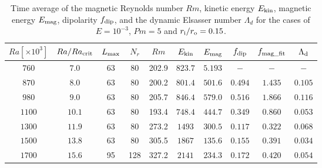 \begin{table}
\begin{center}
\caption{Time average of the magnetic Reynolds number $Rm$, kinetic energy $E_{\rm kin}$, magnetic energy $E_{\rm mag}$, dipolarity $f_{\rm dip}$, and the dynamic Elsasser number $\Lambda_{d}$ for the cases of $E = 10^{-3}$, $Pm = 5$ and $r_{\rm i}/r_{\rm o} = 0.15$.}
 \label{table:Summary_15}

  \begin{tabular}{cccccccccc}
      \hline
     $Ra[\times 10^3]$  &  $Ra/Ra_{\rm crit}$&
     {\color{black} $L_{\rm max}$} & {\color{black} $N_{r}$} & {\color{black} $Rm$} & $E_{\rm kin}$  &  $E_{\rm mag}$ & $f_{\rm dip}$ & $f_{\rm mag\_fit}$ & $\Lambda_{\rm d}$\\
    \hline
    $760$  & $7.0$ & 63 & 80 &  202.9 & $823.7$ & $5.193$ & $-$ & $-$ & $-$ \\
    $870$  & $8.0$ & 63 & 80 &  200.2 & $801.4$ & $501.6$ & $0.494$ & $1.435$ &  $0.105$\\
    $980$  & $9.0$ & 63 & 80 &  205.7 & $846.4$ & $579.0$ & $0.516$ & $1.866$ & $0.116$\\
    $1100$  & $10.1$ & 63 & 80 &  193.4 & $748.4$ & $444.7$ & $0.349$ & $0.860$ & $0.053$\\
    $1300$  & $11.9$ & 63 & 80 &  273.2 & $1493$ & $300.5$ & $0.117$ & $0.322$ & $0.068$\\
    $1500$  & $13.8$ & 63 & 80 &  305.5 & $1867$ & $135.6$ & $0.155$ & $0.391$ & $0.034$\\
    $1700$  & $15.6$ & 95 & 128 & 327.2 & $2141$ & $234.3$ & $0.172$ & $0.420$ & $0.054$\\
     \hline
  \end{tabular}
 \end{center}
 \end{table}